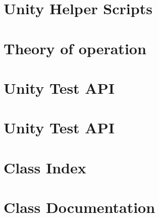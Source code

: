 \documentclass[twoside]{book}
\newcommand{\+}{\discretionary{\mbox{\scriptsize$\hookleftarrow$}}{}{}}
\newcommand{\clearemptydoublepage}{%
  \newpage{\pagestyle{empty}\cleardoublepage}%
}
\begin{document}
\chapter{Unity Helper Scripts}
\label{md_test_unity_docs_UnityHelperScriptsGuide}

\chapter{Theory of operation}
\label{md_test_unity_examples_example_2_src_theory_of_operation}

\chapter{Unity Test A\+PI}
\label{md_test_unity_examples_example_2_test_unity_README}

\chapter{Unity Test A\+PI}
\label{md_test_unity_README}

\chapter{Class Index}

\chapter{Class Documentation}
















\backmatter
\newpage
{}
\clearemptydoublepage
{}
\printindex
\end{document}
